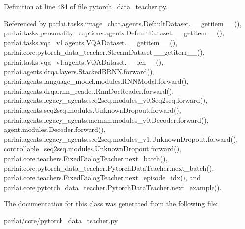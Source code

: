 Definition at line 484 of file pytorch\+\_\+data\+\_\+teacher.\+py.



Referenced by parlai.\+tasks.\+image\+\_\+chat.\+agents.\+Default\+Dataset.\+\_\+\+\_\+getitem\+\_\+\+\_\+(), parlai.\+tasks.\+personality\+\_\+captions.\+agents.\+Default\+Dataset.\+\_\+\+\_\+getitem\+\_\+\+\_\+(), parlai.\+tasks.\+vqa\+\_\+v1.\+agents.\+V\+Q\+A\+Dataset.\+\_\+\+\_\+getitem\+\_\+\+\_\+(), parlai.\+core.\+pytorch\+\_\+data\+\_\+teacher.\+Stream\+Dataset.\+\_\+\+\_\+getitem\+\_\+\+\_\+(), parlai.\+tasks.\+vqa\+\_\+v1.\+agents.\+V\+Q\+A\+Dataset.\+\_\+\+\_\+len\+\_\+\+\_\+(), parlai.\+agents.\+drqa.\+layers.\+Stacked\+B\+R\+N\+N.\+forward(), parlai.\+agents.\+language\+\_\+model.\+modules.\+R\+N\+N\+Model.\+forward(), parlai.\+agents.\+drqa.\+rnn\+\_\+reader.\+Rnn\+Doc\+Reader.\+forward(), parlai.\+agents.\+legacy\+\_\+agents.\+seq2seq.\+modules\+\_\+v0.\+Seq2seq.\+forward(), parlai.\+agents.\+seq2seq.\+modules.\+Unknown\+Dropout.\+forward(), parlai.\+agents.\+legacy\+\_\+agents.\+memnn.\+modules\+\_\+v0.\+Decoder.\+forward(), agent.\+modules.\+Decoder.\+forward(), parlai.\+agents.\+legacy\+\_\+agents.\+seq2seq.\+modules\+\_\+v1.\+Unknown\+Dropout.\+forward(), controllable\+\_\+seq2seq.\+modules.\+Unknown\+Dropout.\+forward(), parlai.\+core.\+teachers.\+Fixed\+Dialog\+Teacher.\+next\+\_\+batch(), parlai.\+core.\+pytorch\+\_\+data\+\_\+teacher.\+Pytorch\+Data\+Teacher.\+next\+\_\+batch(), parlai.\+core.\+teachers.\+Fixed\+Dialog\+Teacher.\+next\+\_\+episode\+\_\+idx(), and parlai.\+core.\+pytorch\+\_\+data\+\_\+teacher.\+Pytorch\+Data\+Teacher.\+next\+\_\+example().



The documentation for this class was generated from the following file\+:\begin{DoxyCompactItemize}
\item 
parlai/core/\hyperlink{pytorch__data__teacher_8py}{pytorch\+\_\+data\+\_\+teacher.\+py}\end{DoxyCompactItemize}
